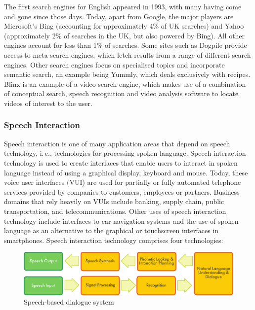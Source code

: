 \documentclass[]{../../metanetpaper}
\begin{document}
\begin{multicols}{2}
The first search engines for English appeared in 1993, with many having come and gone since those days. Today, apart from Google, the major players are Microsoft's Bing (accounting for approximately 4\% of UK searches) and Yahoo (approximately 2\% of searches in the UK, but also powered by Bing). All other engines account for less than 1\% of searches. Some sites such as Dogpile provide access to meta-search engines, which fetch results from a range of different search engines. Other search engines focus on specialised topics and incorporate semantic search, an example being Yummly, which deals exclusively with recipes. Blinx is an example of a video search engine, which makes use of a combination of conceptual search, speech recognition and video analysis software to locate videos of interest to the user.

\subsubsection{Speech Interaction}

Speech interaction is one of many application areas that depend on speech technology, i.\,e., technologies for processing spoken language. Speech interaction technology is used to create interfaces that enable users to interact in spoken language instead of using a graphical display, keyboard and mouse.  Today, these voice user interfaces (VUI) are used for partially or fully automated telephone services provided by companies to customers, employees or partners. Business domains that rely heavily on VUIs include banking, supply chain, public transportation, and telecommunications. Other uses of speech interaction technology include interfaces to car navigation systems and the use of spoken language as an alternative to the graphical or touchscreen interfaces in smartphones. Speech interaction technology comprises four technologies: 

\begin{figure}[htb]
  \center
  \includegraphics[width=\textwidth]{../_media/english/simple_speech-based_dialogue_architecture}
  \caption{Speech-based dialogue system}
  \label{fig:dialoguearch_en}
\end{figure}


\end{multicols}
\end{document}
